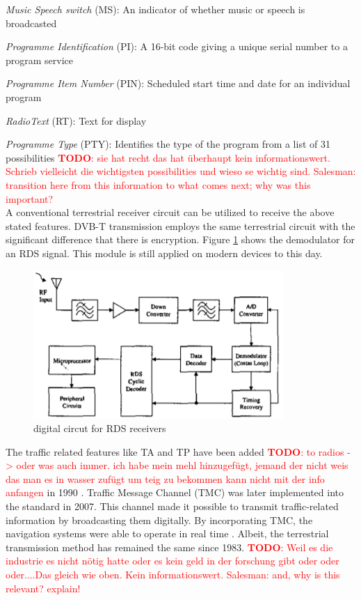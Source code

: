 \documentclass[conference,11pt,a4paper]{IEEEtran}
\newcommand{\todo}[1]{\textcolor{red}{\textbf{TODO}: #1}}
\begin{document}
	\textit{Music Speech switch} (MS): An indicator of whether music or speech is broadcasted
	
	\textit{Programme Identification} (PI): A 16-bit code giving a unique serial number to a program service
	
	\textit{Programme Item Number} (PIN): Scheduled start time and date for an individual program
	
	\textit{RadioText}  (RT): Text for display
	
	\textit{Programme Type} (PTY): Identifies the type of the program from a list of 31 possibilities \todo{sie hat recht das hat überhaupt kein informationswert. Schrieb vielleicht die wichtigsten possibilities und wieso se wichtig sind. Salesman: transition here from this information to what comes next; why was this important?}\\
	
	A conventional terrestrial receiver circuit can be utilized to receive the above stated features. DVB-T transmission employs the same terrestrial circuit with the significant difference that there is encryption. Figure \ref{fig: receiverCircut} shows the demodulator for an RDS signal. This module is still applied on modern devices to this day.
	
	\begin{figure}[h]
		\centering
		\includegraphics[width = \linewidth]{img/circut}
		\caption{digital circut for RDS receivers}
		\label{fig: receiverCircut}
	\end{figure}
	
	The traffic related features like TA and TP have been added \todo{to radios -> oder was auch immer. ich habe mein mehl hinzugefügt, jemand der nicht weis das man es in wasser zufügt um teig zu bekommen kann nicht mit der info anfangen} in 1990 \cite{TATP}. Traffic Message Channel (TMC) was later implemented into the standard in 2007. This channel made it possible to transmit traffic-related information by broadcasting them digitally. By incorporating TMC, the navigation systems were able to operate in real time  \cite{barca2017radio}. Albeit, the terrestrial transmission method has remained the same since 1983. \todo{Weil es die industrie es nicht nötig hatte oder es kein geld in der forschung gibt oder oder oder....Das gleich wie oben. Kein informationswert. Salesman: and, why is this relevant? explain!}\\
	
\end{document}
